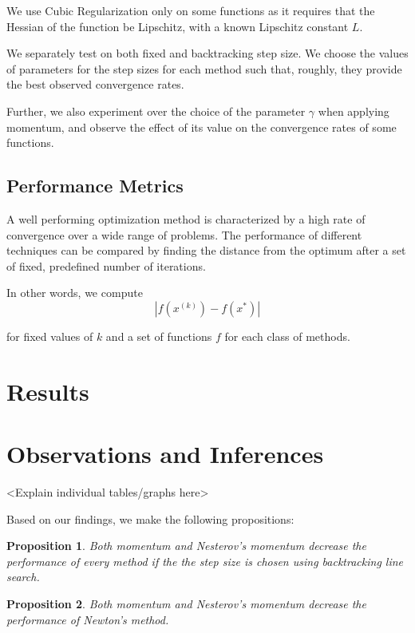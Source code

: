 \documentclass{article}
\newtheorem{prop}{Proposition}
\begin{document}
We use Cubic Regularization only on some functions as it requires that the Hessian of the function be Lipschitz, with a known Lipschitz constant $L$.

We separately test on both fixed and backtracking step size. We choose the values of parameters for the step sizes for each method such that, roughly, they provide the best observed convergence rates.

Further, we also experiment over the choice of the parameter $\gamma$ when applying momentum, and observe the effect of its value on the convergence rates of some functions.

\subsection{Performance Metrics}
A well performing optimization method is characterized by a high rate of convergence over a wide range of problems. The performance of different techniques can be compared by finding the distance from the optimum after a set of fixed, predefined number of iterations.

In other words, we compute
\begin{equation}
|f(x^{(k)}) - f(x^*)|
\end{equation}

for fixed values of $k$ and a set of functions $f$ for each class of methods.

\section{Results}\label{results}

\section{Observations and Inferences}\label{inferences}
<Explain individual tables/graphs here>

Based on our findings, we make the following propositions:

\begin{prop}
	Both momentum and Nesterov's momentum decrease the performance of every method if the the step size is chosen using backtracking line search.
\end{prop}

\begin{prop}
	Both momentum and Nesterov's momentum decrease the performance of Newton's method. 
\end{prop}
\end{document}
